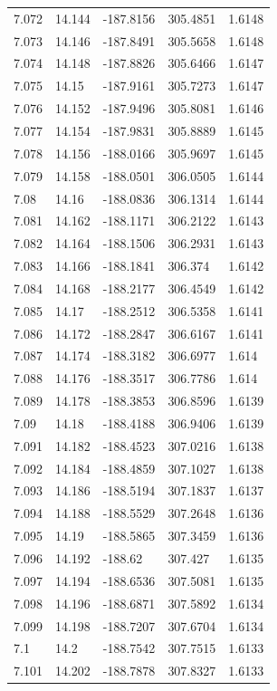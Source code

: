 \begin{tabular}{lllll}
7.072 & 14.144 & -187.8156 & 305.4851 & 1.6148 \\
7.073 & 14.146 & -187.8491 & 305.5658 & 1.6148 \\
7.074 & 14.148 & -187.8826 & 305.6466 & 1.6147 \\
7.075 & 14.15 & -187.9161 & 305.7273 & 1.6147 \\
7.076 & 14.152 & -187.9496 & 305.8081 & 1.6146 \\
7.077 & 14.154 & -187.9831 & 305.8889 & 1.6145 \\
7.078 & 14.156 & -188.0166 & 305.9697 & 1.6145 \\
7.079 & 14.158 & -188.0501 & 306.0505 & 1.6144 \\
7.08 & 14.16 & -188.0836 & 306.1314 & 1.6144 \\
7.081 & 14.162 & -188.1171 & 306.2122 & 1.6143 \\
7.082 & 14.164 & -188.1506 & 306.2931 & 1.6143 \\
7.083 & 14.166 & -188.1841 & 306.374 & 1.6142 \\
7.084 & 14.168 & -188.2177 & 306.4549 & 1.6142 \\
7.085 & 14.17 & -188.2512 & 306.5358 & 1.6141 \\
7.086 & 14.172 & -188.2847 & 306.6167 & 1.6141 \\
7.087 & 14.174 & -188.3182 & 306.6977 & 1.614 \\
7.088 & 14.176 & -188.3517 & 306.7786 & 1.614 \\
7.089 & 14.178 & -188.3853 & 306.8596 & 1.6139 \\
7.09 & 14.18 & -188.4188 & 306.9406 & 1.6139 \\
7.091 & 14.182 & -188.4523 & 307.0216 & 1.6138 \\
7.092 & 14.184 & -188.4859 & 307.1027 & 1.6138 \\
7.093 & 14.186 & -188.5194 & 307.1837 & 1.6137 \\
7.094 & 14.188 & -188.5529 & 307.2648 & 1.6136 \\
7.095 & 14.19 & -188.5865 & 307.3459 & 1.6136 \\
7.096 & 14.192 & -188.62 & 307.427 & 1.6135 \\
7.097 & 14.194 & -188.6536 & 307.5081 & 1.6135 \\
7.098 & 14.196 & -188.6871 & 307.5892 & 1.6134 \\
7.099 & 14.198 & -188.7207 & 307.6704 & 1.6134 \\
7.1 & 14.2 & -188.7542 & 307.7515 & 1.6133 \\
7.101 & 14.202 & -188.7878 & 307.8327 & 1.6133 \\

\end{tabular}
